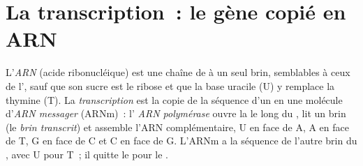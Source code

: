 \section{La transcription~: le gène copié en ARN}

\begin{definition}\label{def:g11:gene-expression:transcription}
L'\emph{ARN} (acide ribonucléique) est une chaîne de
 à un seul brin, semblables à ceux de l', sauf que son
sucre est le ribose et que la base uracile (U) y remplace la thymine
(T). La \emph{transcription} est la copie de la
séquence d'un  en une molécule d'\emph{ARN messager}
(ARNm)~: l' \emph{ARN polymérase} ouvre la  le long
du , lit un brin (le \emph{brin transcrit}) et assemble l'ARN
complémentaire, U en face de A, A en face de T, G en face de C et C en
face de G. L'ARNm a la séquence de l'autre brin du , avec U pour
T~; il quitte le  pour le .
\end{definition}

